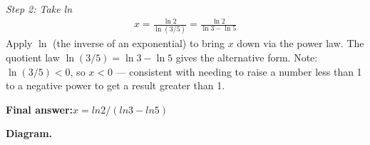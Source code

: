 \documentclass[11pt]{article}
\begin{document}
\textit{Step 2: Take ln}
\[\begin{gathered}
x = \frac{\ln 2}{\ln(3/5)} = \frac{\ln 2}{\ln 3 - \ln 5}
\end{gathered}\]
Apply \( \ln \) (the inverse of an exponential) to bring \( x \) down via the power law. The quotient law \( \ln(3/5) = \ln 3 - \ln 5 \) gives the alternative form. Note: \( \ln(3/5) < 0 \), so \( x < 0 \) --- consistent with needing to raise a number less than 1 to a negative power to get a result greater than 1.

\begin{answerbox}
\textbf{Final answer:}\quad \(\displaystyle x = ln 2 / (ln 3 - ln 5)\)
\end{answerbox}
\textbf{Diagram.}

\begin{center}
\end{center}
\end{document}
